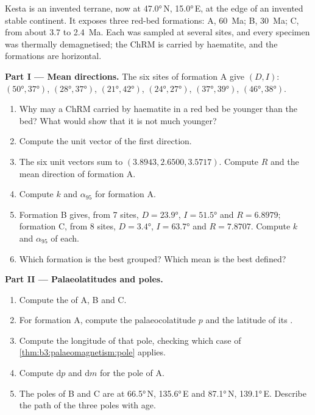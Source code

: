 \begin{problem}
\label{pb:b3:palaeomagnetism:1}
Kesta is an invented terrane, now at \ang{47.0}\,N, \ang{15.0}\,E, at the edge
of an invented stable continent. It exposes three red-bed formations: A,
\qty{60}{Ma}; B, \qty{30}{Ma}; C, from about 3.7 to \qty{2.4}{Ma}. Each was
sampled at several sites, and every specimen was thermally demagnetised; the
ChRM is carried by haematite, and the formations are horizontal.

\medskip\noindent\textbf{Part I --- Mean directions.} The six sites of
formation A give $(D, I)$: $(\ang{50}, \ang{37})$, $(\ang{28}, \ang{37})$,
$(\ang{21}, \ang{42})$, $(\ang{24}, \ang{27})$, $(\ang{37}, \ang{39})$,
$(\ang{46}, \ang{38})$.
\begin{enumerate}
  \item Why may a ChRM carried by haematite in a red bed be younger than the
        bed? What would show that it is not much younger?
  \item Compute the unit vector of the first direction.
  \item The six unit vectors sum to $(3.8943, 2.6500, 3.5717)$. Compute $R$ and
        the mean direction of formation A.
  \item Compute $k$ and $\alpha_{95}$ for formation A.
  \item Formation B gives, from 7 sites, $D = \ang{23.9}$, $I = \ang{51.5}$ and
        $R = 6.8979$; formation C, from 8 sites, $D = \ang{3.4}$, $I =
        \ang{63.7}$ and $R = 7.8707$. Compute $k$ and $\alpha_{95}$ of each.
  \item Which formation is the best grouped? Which mean is the best defined?
\end{enumerate}

\medskip\noindent\textbf{Part II --- Palaeolatitudes and poles.}
\begin{enumerate}[resume]
  \item Compute the  of A, B and C.
  \item For formation A, compute the palaeocolatitude $p$ and the latitude of
        its .
  \item Compute the longitude of that pole, checking which case of
        \cref{thm:b3:palaeomagnetism:pole} applies.
  \item Compute $\mathrm dp$ and $\mathrm dm$ for the pole of A.
  \item The poles of B and C are at \ang{66.5}\,N, \ang{135.6}\,E and
        \ang{87.1}\,N, \ang{139.1}\,E. Describe the path of the three poles
        with age.
\end{enumerate}


\end{problem}
